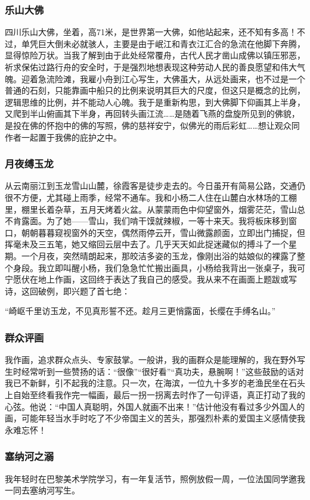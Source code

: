 \documentclass{article}
\begin{document}
\subsubsection{乐山大佛}
四川乐山大佛，坐着，高71米，是世界第一大佛，如他站起来，还不知有多高！不过，单凭巨大倒未必就骇人，主要是由于岷江和青衣江汇合的急流在他脚下奔腾，显得惊险万状。当我了解到由于此处经常覆舟，古代人民才凿山成佛以镇压邪恶，祈求保佑过路行舟的安全时，于是强烈地想表现这种劳动人民的善良愿望和伟大气魄。迎着急流险滩，我雇小舟到江心写生，大佛虽大，从远处画来，也不过是一个普通的石刻，只能靠画中船只的比例来说明其巨大的尺度，但这只是概念的比例，逻辑思维的比例，并不能动人心魄。我于是重新构思，到大佛脚下仰画其上半身，又爬到半山俯画其下半身，再回转头画江流……是随着飞燕的盘旋所见到的佛貌，是投在佛的怀抱中的佛的写照，佛的慈祥安宁，似佛光的雨后彩虹……想让观众同作者一起置于我佛的庇护之中。
\subsubsection{月夜缚玉龙}
从云南丽江到玉龙雪山山麓，徐霞客是徒步走去的。今日虽开有简易公路，交通仍很不方便，尤其碰上雨季，经常不通车。我和小杨二人住在山麓白水林场的工棚里，棚里长着杂草，五月天烤着火盆。从蒙蒙雨色中仰望窗外，烟雾茫茫，雪山总不肯露面。为了她——雪山，我们啃干馍就辣椒，一等十来天。我将板床移到窗口，朝朝暮暮窥视窗外的天空，偶然雨停云开，雪山微露颜面，立即出门捕捉，但挥毫未及三五笔，她又缩回云层中去了。几乎天天如此捉迷藏似的搏斗了一个星期。一个月夜，突然晴朗起来，那皎洁多姿的玉龙，像刚出浴的姑娘似的裸露了整个身段。我立即叫醒小杨，我们急急忙忙搬出画具，小杨给我背出一张桌子，我可宁愿伏在地上作画，这回终于表达了我自己的感受。我从来不在画面上题跋或写诗，这回破例，即兴题了首七绝：

“崎岖千里访玉龙，不见真形誓不还。趁月三更悄露面，长缨在手缚名山。”
\subsubsection{群众评画}
我作画，追求群众点头、专家鼓掌。一般讲，我的画群众是能理解的，我在野外写生时经常听到一些赞扬的话：“很像”“很好看”“真功夫，悬腕啊！”这些鼓励的话对我已不新鲜，引不起我的注意。只一次，在海滨，一位九十多岁的老渔民坐在石头上自始至终看我作完一幅画，最后一拐一拐离去时作了一句评语，真正打动了我的心弦。他说：“中国人真聪明，外国人就画不出来！”估计他没有看过多少外国人的画，可能年轻当水手时吃了不少帝国主义的苦头，那强烈朴素的爱国主义感情使我永难忘怀！
\subsubsection{塞纳河之溺}
我年轻时在巴黎美术学院学习，有一年复活节，照例放假一周，一位法国同学邀我一同去塞纳河写生。
\end{document}
